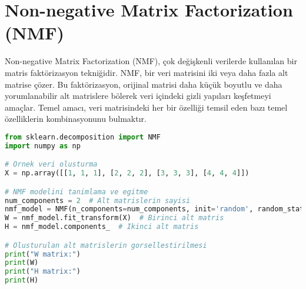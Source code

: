 \section{Non-negative Matrix Factorization (NMF)}
Non-negative Matrix Factorization (NMF), çok değişkenli verilerde kullanılan bir matris faktörizasyon tekniğidir. NMF, bir veri matrisini iki veya daha fazla alt matrise çözer. Bu faktörizasyon, orijinal matrisi daha küçük boyutlu ve daha yorumlanabilir alt matrislere bölerek veri içindeki gizli yapıları keşfetmeyi amaçlar. Temel amacı, veri matrisindeki her bir özelliği temsil eden bazı temel özelliklerin kombinasyonunu bulmaktır.

\begin{lstlisting}[language=Python]
from sklearn.decomposition import NMF
import numpy as np

# Ornek veri olusturma
X = np.array([[1, 1, 1], [2, 2, 2], [3, 3, 3], [4, 4, 4]])

# NMF modelini tanimlama ve egitme
num_components = 2  # Alt matrislerin sayisi
nmf_model = NMF(n_components=num_components, init='random', random_state=42)
W = nmf_model.fit_transform(X)  # Birinci alt matris
H = nmf_model.components_  # Ikinci alt matris

# Olusturulan alt matrislerin gorsellestirilmesi
print("W matrix:")
print(W)
print("H matrix:")
print(H)
\end{lstlisting}

\newpage